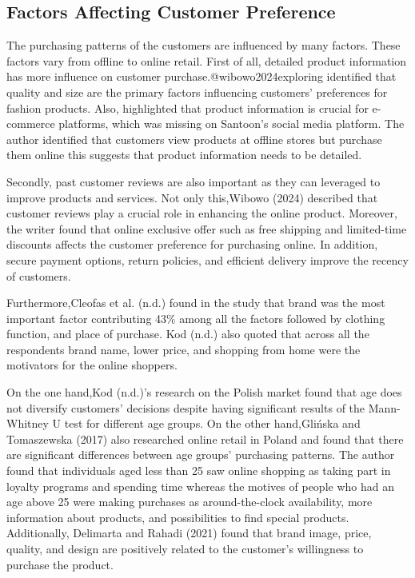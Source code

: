 \documentclass[
  letterpaper,
  DIV=11,
  numbers=noendperiod]{scrartcl}
\begin{document}
\subsection{Factors Affecting Customer
Preference}\label{factors-affecting-customer-preference}

The purchasing patterns of the customers are influenced by many factors.
These factors vary from offline to online retail. First of all, detailed
product information has more influence on customer
purchase.@wibowo2024exploring identified that quality and size are the
primary factors influencing customers' preferences for fashion products.
Also, highlighted that product information is crucial for e-commerce
platforms, which was missing on Santoon's social media platform. The
author identified that customers view products at offline stores but
purchase them online this suggests that product information needs to be
detailed.

Secondly, past customer reviews are also important as they can leveraged
to improve products and services. Not only this,Wibowo (2024) described
that customer reviews play a crucial role in enhancing the online
product. Moreover, the writer found that online exclusive offer such as
free shipping and limited-time discounts affects the customer preference
for purchasing online. In addition, secure payment options, return
policies, and efficient delivery improve the recency of customers.

Furthermore,Cleofas et al. (n.d.) found in the study that brand was the
most important factor contributing 43\% among all the factors followed
by clothing function, and place of purchase. Kod (n.d.) also quoted that
across all the respondents brand name, lower price, and shopping from
home were the motivators for the online shoppers.

On the one hand,Kod (n.d.)'s research on the Polish market found that
age does not diversify customers' decisions despite having significant
results of the Mann-Whitney U test for different age groups. On the
other hand,Glińska and Tomaszewska (2017) also researched online retail
in Poland and found that there are significant differences between age
groups' purchasing patterns. The author found that individuals aged less
than 25 saw online shopping as taking part in loyalty programs and
spending time whereas the motives of people who had an age above 25 were
making purchases as around-the-clock availability, more information
about products, and possibilities to find special products.
Additionally, Delimarta and Rahadi (2021) found that brand image, price,
quality, and design are positively related to the customer's willingness
to purchase the product.
\end{document}
